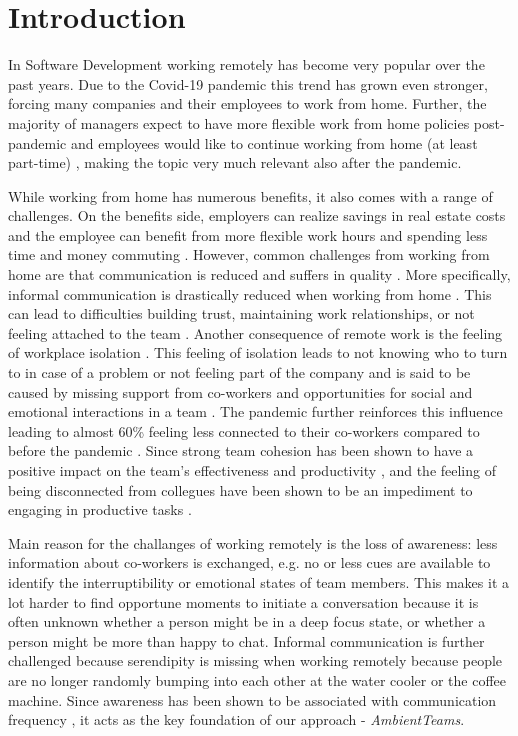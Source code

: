 \chapter{Introduction}
In Software Development working remotely has become very popular over the past years. Due to the  Covid-19 pandemic this trend has grown even stronger, forcing many companies and their employees to work from home.
Further, the majority of managers expect to have more flexible work from home policies post-pandemic and employees would like to continue working from home (at least part-time) \autocite{msworkindexconnection}, making the topic very much relevant also after the pandemic.

While working from home has numerous benefits, it also comes with a range of challenges. On the benefits side, employers can realize savings in real estate costs and the employee can benefit from more flexible work hours and spending less time and money commuting \autocite{mulki2009set}. However, common challenges from working from home are that communication is reduced \autocite{kraut1988patterns} and suffers in quality \autocite{mulki2009set}. More specifically, informal communication is drastically reduced when working from home \autocite{hinds2005understanding}. This can lead to difficulties building trust, maintaining work relationships, or not feeling attached to the team \autocite{comella2020revisiting, olson2006bridging}. Another consequence of remote work is the feeling of workplace isolation \autocite{mulki2009set, marshall2007workplace}. This feeling of isolation leads to not knowing who to turn to in case of a problem or not feeling part of the company and is said to be caused by missing support from co-workers and opportunities for social and emotional interactions in a team \autocite{marshall2007workplace}. The pandemic further reinforces this influence leading to almost 60\% feeling less connected to their co-workers compared to before the pandemic \autocite{msworkindexconnection}. Since strong team cohesion has been shown to have a positive impact on the team's effectiveness and productivity \autocite{carlson2017virtual}, and the feeling of being disconnected from collegues have been shown to be an impediment to engaging in productive tasks \autocite{lostFocus2020}.

Main reason for the challanges of working remotely is the loss of awareness: less information about co-workers is exchanged, e.g. no or less cues are available to identify the interruptibility or emotional states of team members. This makes it a lot harder to find opportune moments to initiate a conversation because it is often unknown whether a person might be in a deep focus state, or whether a person might be more than happy to chat. Informal communication is further challenged because serendipity is missing when working remotely because people are no longer randomly bumping into each other at the water cooler or the coffee machine. Since awareness has been shown to be associated with communication frequency \autocite{chang2007out}, it acts as the key foundation of our approach - \textit{AmbientTeams}.

